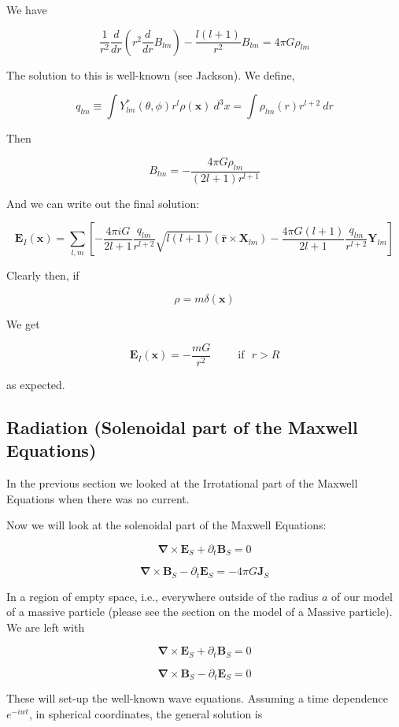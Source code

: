 \documentclass {article}
\renewcommand\vec{\mathbf}
\let\OldS\nabla
\renewcommand{\nabla}{\boldsymbol{\OldS}}
\let\OldHat\hat
\renewcommand{\hat}[1]{\OldHat{\mathbf{#1}}}
\begin{document}
We have

$$\frac 1 {r^2} \frac d {dr} \left( r^2 \frac d {dr} B_{lm} \right) - \frac {l(l+1)} {r^2} B_{lm} = 4 \pi G \rho_{lm}$$

The solution to this is well-known (see Jackson). We define,

$$q_{lm} \equiv \int Y_{lm}^* (\theta, \phi) r^l  \rho (\vec x) ~ d^3x = \int \rho_{lm} (r) r^{l+2} ~ dr $$

Then 

$$ B_{lm} = - \frac {4 \pi G \rho_{lm}} {(2l +1) r^{l+1}} $$ 
 

And we can write out the final solution:

$$\vec E_I(\vec x) = \sum_{l,m} \left[ -\frac {4\pi i G }{2l+1} \frac {q_{lm}}{r^{l+2}} \sqrt {l(l+1)} \left(\hat r \times \vec X_{lm} \right)  - \frac {4 \pi G (l+1)}{2l+1} \frac {q_{lm}}{r^{l+2}} \vec Y_{lm} \right] $$


Clearly then, if

$$\rho = m\delta(\vec x) $$

We get

$$\vec E_I(\vec x) = - \frac {mG} {r^2}  ~~~~~~~~~~~ \textrm{if} ~~~ r > R$$

as expected.
\newpage
\subsection{Radiation (Solenoidal part of the Maxwell Equations)}

In the previous section we looked at the Irrotational part of the Maxwell Equations when there was no current.

Now we will look at the solenoidal part of the Maxwell Equations:

$$\nabla \times \vec E_S + \partial_t \vec B_S = 0 $$

$$\nabla \times \vec B_S - \partial_t \vec E_S =  - 4 \pi G \vec J_S$$

In a region of empty space, i.e., everywhere outside of the radius $a$ of our model of a massive particle (please see the section on the model of a Massive particle). We are left with 

$$\nabla \times \vec E_S + \partial_t \vec B_S = 0 $$

$$\nabla \times \vec B_S - \partial_t \vec E_S =  0$$

These will set-up the well-known wave equations. Assuming a time dependence $e^{-iwt}$, in spherical coordinates, the general solution is
\end{document}
